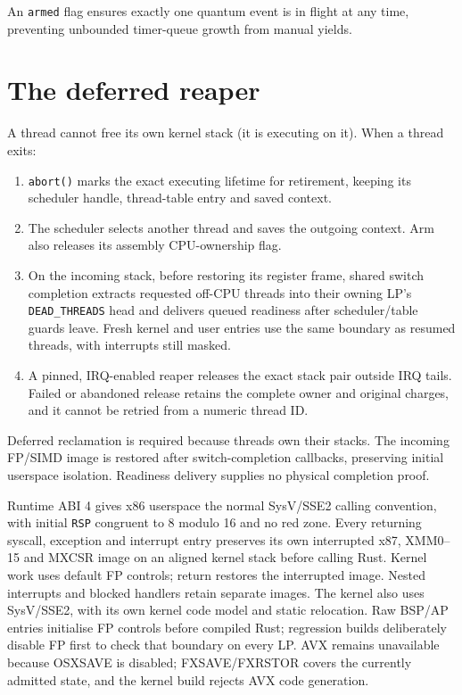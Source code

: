 An \texttt{armed} flag ensures exactly one quantum event is in flight at any time,
preventing unbounded timer-queue growth from manual yields.

\section{The deferred reaper}

A thread cannot free its own kernel stack (it is executing on it). When a thread
exits:

\begin{enumerate}
    \item \texttt{abort()} marks the exact executing lifetime for retirement,
        keeping its scheduler handle, thread-table entry and saved context.
    \item The scheduler selects another thread and saves the outgoing context.
        Arm also releases its assembly CPU-ownership flag.
    \item On the incoming stack, before restoring its register frame, shared
        switch completion extracts requested off-CPU threads into their owning
        LP's \texttt{DEAD\_THREADS} head and delivers queued readiness after
        scheduler/table guards leave. Fresh kernel and user entries use the
        same boundary as resumed threads, with interrupts still masked.
    \item A pinned, IRQ-enabled reaper releases the exact stack pair outside
        IRQ tails. Failed or abandoned release retains the complete owner and
        original charges, and it cannot be retried from a numeric thread ID.
\end{enumerate}

Deferred reclamation is required because threads own their stacks. The incoming
FP/SIMD image is restored after switch-completion callbacks, preserving initial
userspace isolation. Readiness delivery supplies no physical completion proof.

Runtime ABI 4 gives x86 userspace the normal SysV/SSE2 calling convention,
with initial \texttt{RSP} congruent to 8 modulo 16 and no red zone. Every
returning syscall, exception and interrupt entry preserves its own interrupted
x87, XMM0--15 and MXCSR image on an aligned kernel stack before calling Rust.
Kernel work uses default FP controls; return restores the interrupted image.
Nested interrupts and blocked handlers retain separate images. The kernel
also uses SysV/SSE2, with its own kernel code model and static relocation.
Raw BSP/AP entries initialise FP controls before compiled Rust; regression
builds deliberately disable FP first to check that boundary on every LP.
AVX remains unavailable because OSXSAVE is disabled; FXSAVE/FXRSTOR covers
the currently admitted state, and the kernel build rejects AVX code generation.

